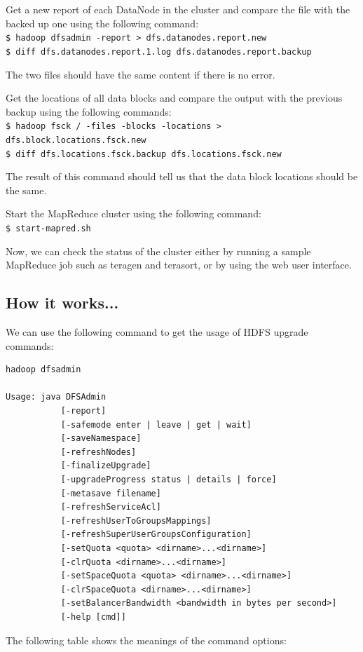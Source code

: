 Get a new report of each DataNode in the cluster and compare the file with the backed up one using the following command: \\ 
\verb|$ hadoop dfsadmin -report > dfs.datanodes.report.new| \\
\verb|$ diff dfs.datanodes.report.1.log dfs.datanodes.report.backup| 

The two files should have the same content if there is no error.

Get the locations of all data blocks and compare the output with the previous backup using the following commands: \\ 
\verb|$ hadoop fsck / -files -blocks -locations > dfs.block.locations.fsck.new| \\ 
\verb|$ diff dfs.locations.fsck.backup dfs.locations.fsck.new |

The result of this command should tell us that the data block locations should be the same. 

Start the MapReduce cluster using the following command: \\ 
\verb|$ start-mapred.sh| 

Now, we can check the status of the cluster either by running a sample MapReduce job such as teragen and terasort, or by using the web user interface.

\subsection*{How it works...}
We can use the following command to get the usage of HDFS upgrade commands:
\begin{verbatim}
hadoop dfsadmin

Usage: java DFSAdmin
           [-report]
           [-safemode enter | leave | get | wait]
           [-saveNamespace]
           [-refreshNodes]
           [-finalizeUpgrade]
           [-upgradeProgress status | details | force]
           [-metasave filename]
           [-refreshServiceAcl]
           [-refreshUserToGroupsMappings]
           [-refreshSuperUserGroupsConfiguration]
           [-setQuota <quota> <dirname>...<dirname>]
           [-clrQuota <dirname>...<dirname>]
           [-setSpaceQuota <quota> <dirname>...<dirname>]
           [-clrSpaceQuota <dirname>...<dirname>]
           [-setBalancerBandwidth <bandwidth in bytes per second>]
           [-help [cmd]]
\end{verbatim}

The following table shows the meanings of the command options:

